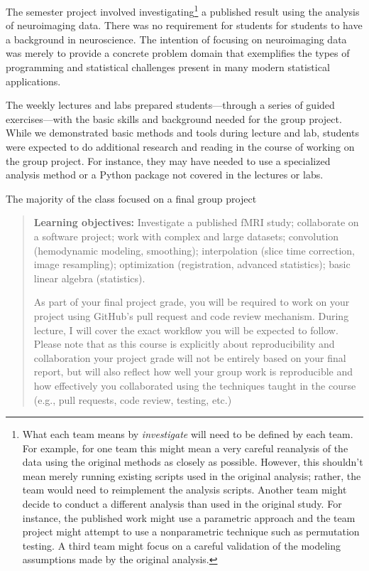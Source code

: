 The semester project involved investigating\footnote{What each team means by
\emph{investigate} will need to be defined by each team.
For example, for one team this might mean a very careful reanalysis of the data
using the original methods as closely as possible.  However, this shouldn't
mean merely running existing scripts used in the original analysis; rather, the
team would need to reimplement the analysis scripts.  Another team might decide
to conduct a different analysis than used in the original study.  For instance,
the published work might use a parametric approach and the team project might
attempt to use a nonparametric technique such as permutation testing.  A third
team might focus on a careful validation of the modeling assumptions made by
the original analysis.}
a published result using the analysis of neuroimaging data.
There was no requirement for students for students to have a background in
neuroscience.
The intention of focusing on neuroimaging data was  merely to provide a
concrete problem domain that exemplifies the types of programming and
statistical challenges present in many modern statistical applications.

The weekly lectures and labs prepared students---through a
series of guided exercises---with the basic skills and
background needed for the group project.
While we demonstrated basic methods and tools during lecture and lab,
students were expected to do additional research and reading in the course
of working on the group project.
For instance, they may have needed to use a specialized analysis
method or a Python package not covered in the lectures or labs.

The majority of the class focused on a final group project

\begin{quote}
\textbf{Learning objectives:} Investigate a published fMRI study;
collaborate on a software project; work with complex and large datasets; convolution
(hemodynamic modeling, smoothing); interpolation (slice time correction, image
resampling); optimization (registration, advanced statistics); basic linear
algebra (statistics).


As part of your final project grade, you will be required to work on your
project using GitHub's pull request and code review mechanism.  During lecture,
I will cover the exact workflow you will be expected to follow.  Please note
that as this course is explicitly about reproducibility and collaboration your
project grade will not be entirely based on your final report, but will also
reflect how well your group work is reproducible and how effectively you
collaborated using the techniques taught in the course (e.g., pull requests,
code review, testing, etc.)
\end{quote}

